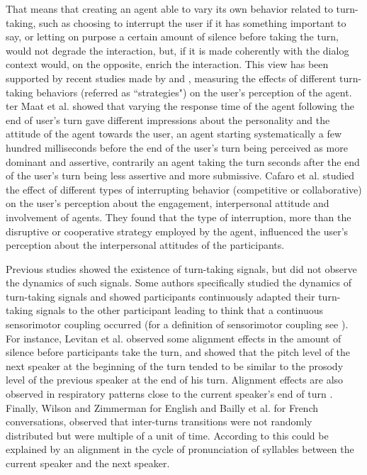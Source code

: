 That means that creating an agent able to vary its
own behavior related to turn-taking, such as choosing to
interrupt the user if it has something important to say,
or letting on purpose a certain amount of silence before
taking the turn, would not degrade the interaction, but,
if it is made coherently with the dialog context would, on the
opposite, enrich the interaction. This view has been
supported by recent studies made by \citep{ter_maat_how_2010} and \citep{cafaro_effects_2016}, measuring
the effects of different turn-taking behaviors (referred as ``strategies") on
the user's perception of the agent.
ter Maat et al.\citep{ter_maat_how_2010} showed that varying the response time of the agent following the end of user's turn gave different impressions about the personality and the attitude of the agent towards the user, an agent starting systematically a few hundred milliseconds before the end of the user's turn being perceived as more dominant and assertive, contrarily an agent taking the turn seconds after the end of the user's turn being less assertive and more submissive.  
Cafaro et al.\citep{cafaro_effects_2016} studied the effect of different types of interrupting
behavior (competitive or collaborative) on the user's
perception about the engagement, interpersonal attitude
and involvement of agents. They found that the type of interruption, more than
the disruptive or cooperative strategy employed by the
agent, influenced the user's perception about the interpersonal
attitudes of the participants.
 
Previous studies showed the existence of turn-taking signals, but did not observe the dynamics of such signals.
Some authors specifically studied the dynamics of turn-taking signals and showed participants continuously adapted their turn-taking signals to the other participant leading to think that a continuous sensorimotor coupling occurred (for a definition of sensorimotor coupling see \citep{warren_dynamics_2006}).
For instance,  Levitan et al. \citep{levitan_entrainment_2015} observed some
alignment effects in the amount of silence before participants
take the turn, and showed that the pitch level of
the next speaker at the beginning of the turn tended to
be similar to the prosody level of the previous speaker
at the end of his turn. 
Alignment effects are also observed in respiratory patterns close to the current speaker's end of turn \citep{mcfarland_respiratory_2001}.
Finally, Wilson and Zimmerman \citep{wilson_structure_1986} for English and Bailly et al. \citep{bailly_pauses_2012} for French conversations, observed that inter-turns transitions were not randomly distributed but were multiple of a unit of time. According to \citep{wilson_oscillator_2005} this could be explained by an alignment in the cycle of pronunciation of syllables between the current speaker and the next speaker.

